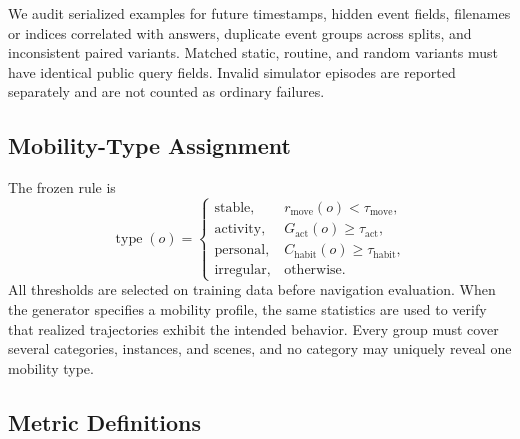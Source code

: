 We audit serialized examples for future timestamps, hidden event fields, filenames or indices correlated with answers, duplicate event groups across splits, and inconsistent paired variants. Matched static, routine, and random variants must have identical public query fields. Invalid simulator episodes are reported separately and are not counted as ordinary failures.

\subsection{Mobility-Type Assignment}
\label{app:mobility}

The frozen rule is
\begin{equation}
\operatorname{type}(o)=
\begin{cases}
\mathrm{stable}, & r_{\mathrm{move}}(o)<\tau_{\mathrm{move}},\\
\mathrm{activity}, & G_{\mathrm{act}}(o)\geq\tau_{\mathrm{act}},\\
\mathrm{personal}, & C_{\mathrm{habit}}(o)\geq\tau_{\mathrm{habit}},\\
\mathrm{irregular}, & \text{otherwise}.
\end{cases}
\end{equation}
All thresholds are selected on training data before navigation evaluation. When the generator specifies a mobility profile, the same statistics are used to verify that realized trajectories exhibit the intended behavior. Every group must cover several categories, instances, and scenes, and no category may uniquely reveal one mobility type.

\subsection{Metric Definitions}
\label{app:metrics}

